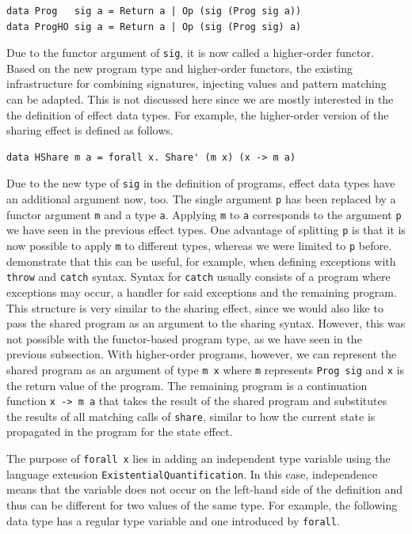 \documentclass[a4paper, 11pt, fleqn, twoside]{scrreprt}
\newcommand{\hinl}[1]{\texttt{#1}}
\begin{document}
\begin{verbatim}
data Prog   sig a = Return a | Op (sig (Prog sig a))
data ProgHO sig a = Return a | Op (sig (Prog sig) a)
\end{verbatim}

Due to the functor argument of \hinl{sig}, it is now called a higher-order functor.
Based on the new program type and higher-order functors, the existing infrastructure for combining signatures, injecting values and pattern matching can be adapted.
This is not discussed here since we are mostly interested in the the definition of effect data types.
For example, the higher-order version of the sharing effect is defined as follows.

\begin{verbatim}
data HShare m a = forall x. Share' (m x) (x -> m a)
\end{verbatim}

Due to the new type of \hinl{sig} in the definition of programs, effect data types have an additional argument now, too.
The single argument \hinl{p} has been replaced by a functor argument \hinl{m} and a type \hinl{a}.
Applying \hinl{m} to \hinl{a} corresponds to the argument \hinl{p} we have seen in the previous effect types.
One advantage of splitting \hinl{p} is that it is now possible to apply \hinl{m} to different types, whereas we were limited to \hinl{p} before.
\citet{wu2014effect} demonstrate that this can be useful, for example, when defining exceptions with \hinl{throw} and \hinl{catch} syntax.
Syntax for \hinl{catch} usually consists of a program where exceptions may occur, a handler for said exceptions and the remaining program.
This structure is very similar to the sharing effect, since we would also like to pass the shared program as an argument to the sharing syntax.
However, this was not possible with the functor-based program type, as we have seen in the previous subsection.
With higher-order programs, however, we can represent the shared program as an argument of type \hinl{m x} where \hinl{m} represents \hinl{Prog sig} and \hinl{x} is the return value of the program.
The remaining program is a continuation function \hinl{x -> m a} that takes the result of the shared program and substitutes the results of all matching calls of \hinl{share}, similar to how the current state is propagated in the program for the state effect.

The purpose of \hinl{forall x} lies in adding an independent type variable using the language extension \hinl{ExistentialQuantification}.
In this case, independence means that the variable does not occur on the left-hand side of the definition and thus can be different for two values of the same type.
For example, the following data type has a regular type variable and one introduced by \hinl{forall}.
\end{document}

